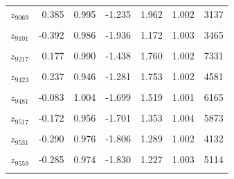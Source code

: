 \begin{longtable}{lrrrrrr}
$z_{9069}$ & 0.385 & 0.995 & -1.235 & 1.962 & 1.002 & 3137\\
\cellcolor{gray!10}{$z_{9092}$} & \cellcolor{gray!10}{-0.307} & \cellcolor{gray!10}{0.948} & \cellcolor{gray!10}{-1.826} & \cellcolor{gray!10}{1.221} & \cellcolor{gray!10}{1.000} & \cellcolor{gray!10}{4894}\\
$z_{9101}$ & -0.392 & 0.986 & -1.936 & 1.172 & 1.003 & 3465\\
\cellcolor{gray!10}{$z_{9106}$} & \cellcolor{gray!10}{-0.012} & \cellcolor{gray!10}{0.988} & \cellcolor{gray!10}{-1.581} & \cellcolor{gray!10}{1.592} & \cellcolor{gray!10}{1.002} & \cellcolor{gray!10}{7295}\\
$z_{9217}$ & 0.177 & 0.990 & -1.438 & 1.760 & 1.002 & 7331\\
\cellcolor{gray!10}{$z_{9322}$} & \cellcolor{gray!10}{-0.199} & \cellcolor{gray!10}{0.990} & \cellcolor{gray!10}{-1.801} & \cellcolor{gray!10}{1.367} & \cellcolor{gray!10}{1.002} & \cellcolor{gray!10}{6132}\\
$z_{9423}$ & 0.237 & 0.946 & -1.281 & 1.753 & 1.002 & 4581\\
\cellcolor{gray!10}{$z_{9460}$} & \cellcolor{gray!10}{-0.286} & \cellcolor{gray!10}{0.996} & \cellcolor{gray!10}{-1.874} & \cellcolor{gray!10}{1.305} & \cellcolor{gray!10}{1.003} & \cellcolor{gray!10}{5889}\\
$z_{9481}$ & -0.083 & 1.004 & -1.699 & 1.519 & 1.001 & 6165\\
\cellcolor{gray!10}{$z_{9498}$} & \cellcolor{gray!10}{0.244} & \cellcolor{gray!10}{0.952} & \cellcolor{gray!10}{-1.296} & \cellcolor{gray!10}{1.755} & \cellcolor{gray!10}{1.005} & \cellcolor{gray!10}{5163}\\
$z_{9517}$ & -0.172 & 0.956 & -1.701 & 1.353 & 1.004 & 5873\\
\cellcolor{gray!10}{$z_{9518}$} & \cellcolor{gray!10}{-0.186} & \cellcolor{gray!10}{0.970} & \cellcolor{gray!10}{-1.751} & \cellcolor{gray!10}{1.321} & \cellcolor{gray!10}{1.001} & \cellcolor{gray!10}{5575}\\
$z_{9531}$ & -0.290 & 0.976 & -1.806 & 1.289 & 1.002 & 4132\\
\cellcolor{gray!10}{$z_{9557}$} & \cellcolor{gray!10}{-0.265} & \cellcolor{gray!10}{0.954} & \cellcolor{gray!10}{-1.762} & \cellcolor{gray!10}{1.270} & \cellcolor{gray!10}{1.005} & \cellcolor{gray!10}{4665}\\
$z_{9559}$ & -0.285 & 0.974 & -1.830 & 1.227 & 1.003 & 5114\\
\cellcolor{gray!10}{$z_{9560}$} & \cellcolor{gray!10}{-0.010} & \cellcolor{gray!10}{0.958} & \cellcolor{gray!10}{-1.537} & \cellcolor{gray!10}{1.530} & \cellcolor{gray!10}{1.001} & \cellcolor{gray!10}{5846}\\

\end{longtable}
